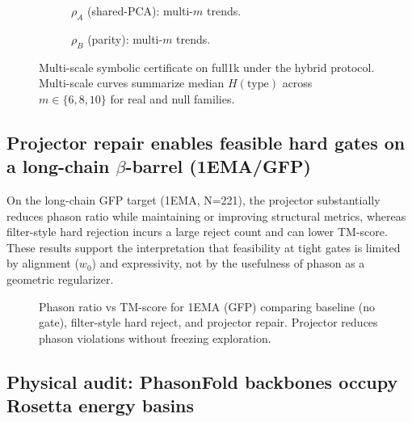 \begin{figure}[t]
  \centering
  \begin{subfigure}[t]{0.49\linewidth}
    \centering
    \caption{$\rho_A$ (shared-PCA): multi-$m$ trends.}
  \end{subfigure}
  \hfill
  \begin{subfigure}[t]{0.49\linewidth}
    \centering
    \caption{$\rho_B$ (parity): multi-$m$ trends.}
  \end{subfigure}
  \caption{Multi-scale symbolic certificate on full1k under the hybrid protocol. Multi-scale curves summarize median $H(\mathrm{type})$ across $m\in\{6,8,10\}$ for real and null families.}
  \label{fig:auric_multiscale_full1k}
\end{figure}

\subsection{Projector repair enables feasible hard gates on a long-chain $\beta$-barrel (1EMA/GFP)}

On the long-chain GFP target (1EMA, N=221), the projector substantially reduces phason ratio while maintaining or improving structural metrics, whereas filter-style hard rejection incurs a large reject count and can lower TM-score. These results support the interpretation that feasibility at tight gates is limited by alignment ($w_0$) and expressivity, not by the usefulness of phason as a geometric regularizer.

\begin{figure}[t]
  \centering
  \caption{Phason ratio vs TM-score for 1EMA (GFP) comparing baseline (no gate), filter-style hard reject, and projector repair. Projector reduces phason violations without freezing exploration.}
  \label{fig:4}
\end{figure}

\subsection{Physical audit: PhasonFold backbones occupy Rosetta energy basins}

